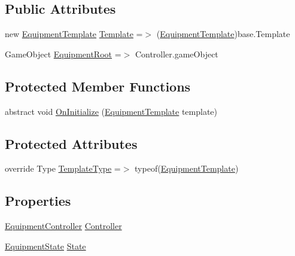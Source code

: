 \subsection*{Public Attributes}
\begin{DoxyCompactItemize}
\item 
new \mbox{\hyperlink{class_equipment_template}{Equipment\+Template}} \mbox{\hyperlink{class_equipment_a691c8de53afa564d0b1a0f1adb0978b7}{Template}} =$>$ (\mbox{\hyperlink{class_equipment_template}{Equipment\+Template}})base.\+Template
\item 
Game\+Object \mbox{\hyperlink{class_equipment_ae1c5b53dfef7c8e2a86c40d72bc5db62}{Equipment\+Root}} =$>$ Controller.\+game\+Object
\end{DoxyCompactItemize}
\subsection*{Protected Member Functions}
\begin{DoxyCompactItemize}
\item 
abstract void \mbox{\hyperlink{class_equipment_ae9932146aba24d5a614d1eb8ab415e10}{On\+Initialize}} (\mbox{\hyperlink{class_equipment_template}{Equipment\+Template}} template)
\end{DoxyCompactItemize}
\subsection*{Protected Attributes}
\begin{DoxyCompactItemize}
\item 
override Type \mbox{\hyperlink{class_equipment_a6058f9d92aff36decfed5b34776aebb4}{Template\+Type}} =$>$ typeof(\mbox{\hyperlink{class_equipment_template}{Equipment\+Template}})
\end{DoxyCompactItemize}
\subsection*{Properties}
\begin{DoxyCompactItemize}
\item 
\mbox{\hyperlink{class_equipment_controller}{Equipment\+Controller}} \mbox{\hyperlink{class_equipment_ac684d7d827057b05d24be2fc46bac14d}{Controller}}
\item 
\mbox{\hyperlink{class_equipment_a8b3877398e5be5b420818b99ad7f0bca}{Equipment\+State}} \mbox{\hyperlink{class_equipment_a90acccabae34547f69244d203cecdaf0}{State}}
\end{DoxyCompactItemize}


